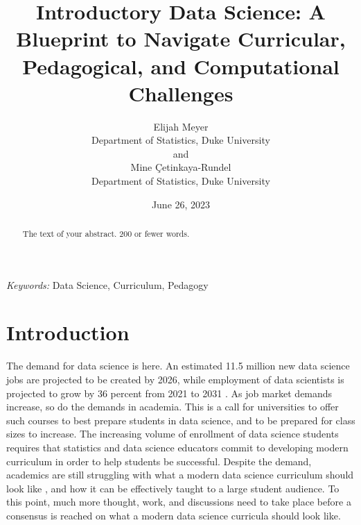 \documentclass[
  12pt]{article}
\begin{document}
\def\spacingset#1{\renewcommand{\baselinestretch}%
{#1}\small\normalsize} \spacingset{1}



\date{June 26, 2023}
\title{\bf Introductory Data Science: A Blueprint to Navigate
Curricular, Pedagogical, and Computational Challenges}
\author{
Elijah Meyer\\
Department of Statistics, Duke University\\
and\\Mine Çetinkaya-Rundel\\
Department of Statistics, Duke University\\
}
\maketitle

\bigskip
\bigskip
\begin{abstract}
The text of your abstract. 200 or fewer words.
\end{abstract}

\noindent%
{\it Keywords:} Data Science, Curriculum, Pedagogy
\vfill

\newpage
\spacingset{1.9} %
\ifdefined\Shaded\renewenvironment{Shaded}{\begin{tcolorbox}[boxrule=0pt, breakable, borderline west={3pt}{0pt}{shadecolor}, enhanced, interior hidden, frame hidden, sharp corners]}{\end{tcolorbox}}\fi

\hypertarget{introduction}{%
\section{Introduction}\label{introduction}}

The demand for data science is here. An estimated 11.5 million new data
science jobs are projected to be created by 2026, while employment of
data scientists is projected to grow by 36 percent from 2021 to 2031
\citep{labor_2022}. As job market demands increase, so do the demands in
academia. This is a call for universities to offer such courses to best
prepare students in data science, and to be prepared for class sizes to
increase. The increasing volume of enrollment of data science students
\citep{Redmond2022} requires that statistics and data science educators
commit to developing modern curriculum in order to help students be
successful. Despite the demand, academics are still struggling with what
a modern data science curriculum should look like \citep{Schwab2020},
and how it can be effectively taught to a large student audience. To
this point, much more thought, work, and discussions need to take place
before a consensus is reached on what a modern data science curricula
should look like.
\end{document}
